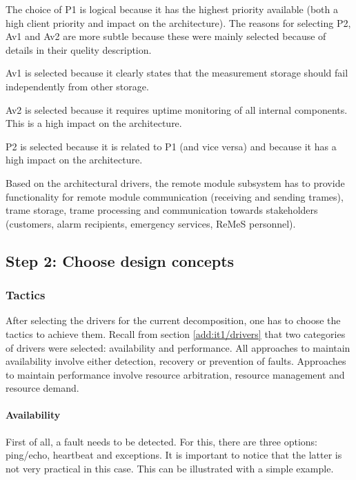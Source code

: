 \npar The choice of P1 is logical because it has the highest priority available
(both a high client priority and impact on the architecture). The reasons for
selecting P2, Av1 and Av2 are more subtle because these were mainly selected
because of details in their quelity description.

\npar Av1 is selected because it clearly states that the measurement storage
should fail independently from other storage. 

\npar Av2 is selected because it requires uptime monitoring of all internal
components. This is a high impact on the architecture. 

\npar P2 is selected because it is related to P1 (and vice versa) and because it
has a high impact on the architecture. 

\npar Based on the architectural drivers, the remote module subsystem has to
provide functionality for remote module communication (receiving and sending
trames), trame storage, trame processing and communication towards stakeholders
(customers, alarm recipients, emergency services, ReMeS personnel).

\subsection{Step 2: Choose design concepts}
\label{add:it1/concepts}

\subsubsection{Tactics}
\label{add:it1/tactics}
 
\npar After selecting the drivers for the current decomposition, one has to
choose the tactics to achieve them. Recall from section \ref{add:it1/drivers}
that two categories of drivers were selected: availability and performance. All
approaches to maintain availability involve either detection, recovery or
prevention of faults. Approaches to maintain performance involve resource
arbitration, resource management and resource demand.
 
\paragraph{Availability}

\npar First of all, a fault needs to be detected. For this, there are three
options: ping/echo, heartbeat and exceptions. It is important to notice that the
latter is not very practical in this case. This can be illustrated with a simple
example.

